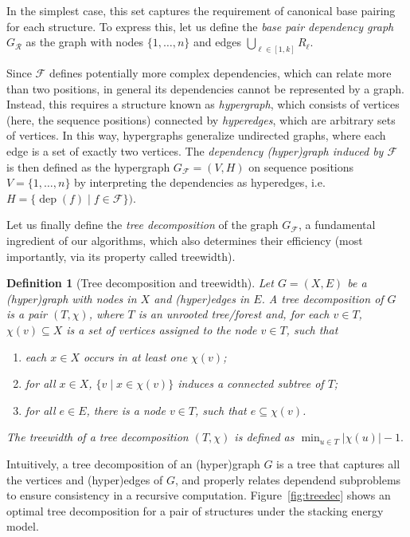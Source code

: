 \documentclass[]{bmcart}
\newtheorem{definition}[theorem]{Definition}
\newcommand{\dep}{\operatorname{dep}}
\newcommand{\F}{\mathcal{F}}
\newcommand{\R}{\mathcal{R}}
\newcommand{\Def}[1]{\emph{#1}}
\newcommand{\revised}[1]{{\color{red} #1}}
\begin{document}
\revised{
In the simplest case, this set captures the requirement of canonical base pairing for each structure.
To express this, let us define the \Def{base pair dependency graph} $G_{\R}$ as the graph with nodes $\{1,\dots,n\}$
and edges $\bigcup_{\ell\in[1,k]} R_\ell$. %

Since $\F$ defines potentially more complex dependencies, which can
relate more than two positions, in general its dependencies cannot be 
represented by a graph. Instead, this requires a structure known as
\Def{hypergraph}, which consists of vertices (here, the sequence
positions) connected by \Def{hyperedges}, which are arbitrary sets of
vertices. In this way, hypergraphs generalize undirected graphs, where
each edge is a set of exactly two vertices.
%
The \Def{dependency (hyper)graph induced by $\F$} is then defined as the hypergraph $G_\F=(V, H)$ on sequence positions $V=\{1,\dots,n\}$
by interpreting the dependencies as hyperedges, i.e. $H =
\{\dep(f)\mid f\in \F\})$.

Let us finally define the \Def{tree decomposition} of the graph $G_\F$, a fundamental ingredient of our algorithms, which also determines their efficiency (most importantly, via its property called treewidth).
}
\begin{definition}[Tree decomposition and treewidth]
  \label{def:treedecomp}
  Let $G=(X, E)$ be a (hyper)graph with nodes in $X$ and (hyper)edges in $E$. A \Def{tree decomposition} of $G$ is
  a pair $(T,\chi)$, where $T$ is an unrooted tree/forest and, for
  each $v\in T$, $\chi(v)\subseteq X$ is a set of vertices assigned to
  the node $v\in T$, such that
\begin{enumerate}
\item each $x\in X$ occurs in at least one $\chi(v)$;
\item for all $x\in X$, $\{ v \mid x \in \chi(v) \}$ induces a connected subtree of $T$;
\item for all $e\in E$, there is a node $v\in T$, such that $e\subseteq\chi(v)$.
\end{enumerate}

\smallskip
\noindent
The \Def{treewidth} of a tree decomposition $(T,\chi)$ is defined as
$\min_{u\in T} |\chi(u)| - 1.$ 
\end{definition}
%
\revised{Intuitively, a tree decomposition of an (hyper)graph $G$ is a tree that captures all the vertices and (hyper)edges of $G$, and properly relates dependend subproblems to ensure consistency in a recursive computation. Figure~\ref{fig:treedec} shows an optimal tree decomposition for a pair of structures under the stacking energy model.}
\end{document}
